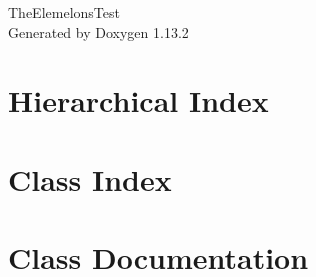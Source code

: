 \documentclass[twoside]{book}
\newcommand{\+}{\discretionary{\mbox{\scriptsize$\hookleftarrow$}}{}{}}
\newcommand{\clearemptydoublepage}{%
    \newpage{\pagestyle{empty}\cleardoublepage}%
  }
\begin{document}
  \raggedbottom
    \hypersetup{pageanchor=false,
                bookmarksnumbered=true,
                pdfencoding=unicode
               }
  \begin{titlepage}
  \vspace*{7cm}
  \begin{center}%
  {\Large The\+Elemelons\+Test}\\
  \vspace*{1cm}
  {\large Generated by Doxygen 1.13.2}\\
  \end{center}
  \end{titlepage}
  \clearemptydoublepage
  \tableofcontents
  \clearemptydoublepage
  \hypersetup{pageanchor=true}
\chapter{Hierarchical Index}

\chapter{Class Index}

\chapter{Class Documentation}















































  \backmatter
  \newpage
  \clearemptydoublepage
  \printindex
\end{document}
